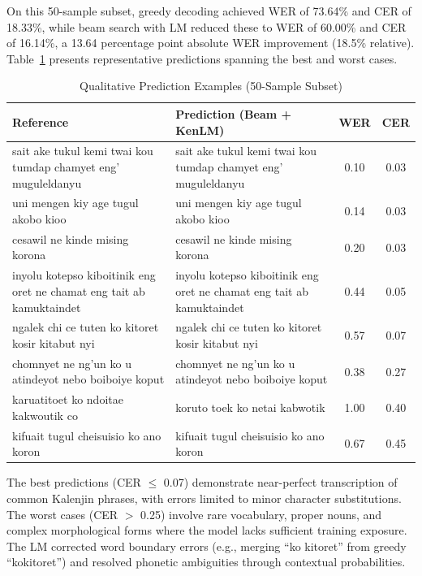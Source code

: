 \documentclass[conference]{IEEEtran}
\begin{document}
On this 50-sample subset, greedy decoding achieved WER of 73.64\% and CER of 18.33\%, while beam search with LM reduced these to WER of 60.00\% and CER of 16.14\%, a 13.64 percentage point absolute WER improvement (18.5\% relative). Table~\ref{tab:predictions} presents representative predictions spanning the best and worst cases.

\begin{table}[!t]
\caption{Qualitative Prediction Examples (50-Sample Subset)}
\label{tab:predictions}
\centering
\small
\begin{tabular}{|p{}|p{}|c|c|}
\hline
\textbf{Reference} & \textbf{Prediction (Beam + KenLM)} & \textbf{WER} & \textbf{CER} \\
\hline
\hline
sait ake tukul kemi twai kou tumdap chamyet eng' muguleldanyu & sait ake tukul kemi twai kou tumdap chamyet eng' muguleldanyu & 0.10 & 0.03 \\
\hline
uni mengen kiy age tugul akobo kioo & uni mengen kiy age tugul akobo kioo & 0.14 & 0.03 \\
\hline
cesawil ne kinde mising korona & cesawil ne kinde mising korona & 0.20 & 0.03 \\
\hline
inyolu kotepso kiboitinik eng oret ne chamat eng tait ab kamuktaindet & inyolu kotepso kiboitinik eng oret ne chamat eng tait ab kamuktaindet & 0.44 & 0.05 \\
\hline
ngalek chi ce tuten ko kitoret kosir kitabut nyi & ngalek chi ce tuten ko kitoret kosir kitabut nyi & 0.57 & 0.07 \\
\hline
\hline
chomnyet ne ng'un ko u atindeyot nebo boiboiye koput & chomnyet ne ng'un ko u atindeyot nebo boiboiye koput & 0.38 & 0.27 \\
\hline
karuatitoet ko ndoitae kakwoutik co & koruto toek ko netai kabwotik & 1.00 & 0.40 \\
\hline
kifuait tugul cheisuisio ko ano koron & kifuait tugul cheisuisio ko ano koron & 0.67 & 0.45 \\
\hline
\end{tabular}
\end{table}

The best predictions (CER $\leq$ 0.07) demonstrate near-perfect transcription of common Kalenjin phrases, with errors limited to minor character substitutions. The worst cases (CER $>$ 0.25) involve rare vocabulary, proper nouns, and complex morphological forms where the model lacks sufficient training exposure. The LM corrected word boundary errors (e.g., merging ``ko kitoret'' from greedy ``kokitoret'') and resolved phonetic ambiguities through contextual probabilities.
\end{document}

